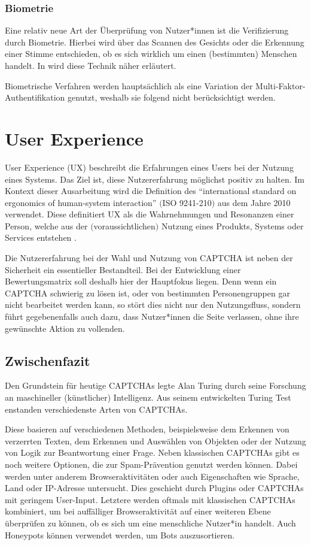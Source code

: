 \subsubsection*{Biometrie}
Eine relativ neue Art der Überprüfung von Nutzer*innen ist die Verifizierung durch Biometrie.
Hierbei wird über das Scannen des Gesichts oder die Erkennung einer Stimme entschieden, ob es sich wirklich um einen (bestimmten) Menschen handelt.
In \cite{rtcaptcha} wird diese Technik näher erläutert. 

Biometrische Verfahren werden hauptsächlich als eine Variation der Multi-Faktor-Authentifikation genutzt,
weshalb sie folgend nicht berücksichtigt werden. 

\section{User Experience}

User Experience (UX) beschreibt die Erfahrungen eines Users bei der Nutzung eines Systems. 
Das Ziel ist, diese Nutzererfahrung möglichst positiv zu halten. 
Im Kontext dieser Ausarbeitung wird die Definition des  ``international standard on ergonomics of human-system interaction'' $($ISO 9241-210$)$
aus dem Jahre 2010 verwendet. 
Diese definitiert UX als die Wahrnehmungen und Resonanzen einer Person, 
welche aus der $($voraussichtlichen$)$ Nutzung eines Produkts, Systems oder Services entstehen \cite[p.1629]{berni_borgianni_2021}.

Die Nutzererfahrung bei der Wahl und Nutzung von CAPTCHA ist neben der Sicherheit ein essentieller Bestandteil.
Bei der Entwicklung einer Bewertungsmatrix soll deshalb hier der Hauptfokus liegen.
Denn wenn ein CAPTCHA schwierig zu lösen ist, oder von bestimmten Personengruppen gar nicht bearbeitet werden kann, so stört dies nicht nur den Nutzungsfluss,
sondern führt gegebenenfalls auch dazu, dass Nutzer*innen die Seite verlassen, ohne ihre gewünschte Aktion zu vollenden. 

\subsection*{Zwischenfazit}
Den Grundstein für heutige CAPTCHAs legte Alan Turing durch seine Forschung an maschineller (künstlicher) Intelligenz.
Aus seinem entwickelten Turing Test enstanden verschiedenste Arten von CAPTCHAs.

Diese basieren auf verschiedenen Methoden,
beispielsweise dem Erkennen von verzerrten Texten, dem Erkennen und Auswählen von Objekten oder
der Nutzung von Logik zur Beantwortung einer Frage.
Neben klassischen CAPTCHAs gibt es noch weitere Optionen, die zur Spam-Prävention genutzt werden können.
Dabei werden unter anderem Browseraktivitäten oder auch Eigenschaften wie Sprache, Land oder IP-Adresse untersucht.
Dies geschieht durch Plugins oder CAPTCHAs mit geringem User-Input.
Letztere werden oftmals mit klassischen CAPTCHAs kombiniert, um bei auffälliger Browseraktivität auf einer weiteren Ebene überprüfen zu können,
ob es sich um eine menschliche Nutzer*in handelt.
Auch Honeypots können verwendet werden, um Bots auszusortieren.

